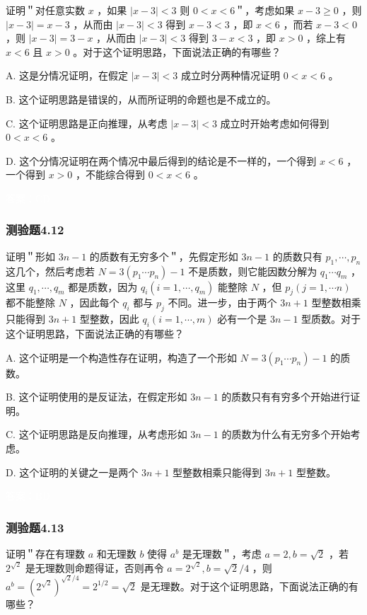 \documentclass[UTF8, heading=true]{ctexart}
\begin{document}
证明＂对任意实数 $x$ ，如果 $|x-3|<3$ 则 $0<x<6$＂，考虑如果 $x-3 \geq 0$ ，则 $|x-3|=x-3$ ，从而由 $|x-3|<3$ 得到 $x-3<3$ ，即 $x<6$ ，而若 $x-3<0$ ，则 $|x-3|=3-x$ ，从而由 $|x-3|<3$ 得到 $3-x<3$ ，即 $x>0$ ，综上有 $x<6$ 且 $x>0$ 。对于这个证明思路，下面说法正确的有哪些？

A. 这是分情况证明，在假定 $|x-3|<3$ 成立时分两种情况证明 $0<x<6$ 。

B. 这个证明思路是错误的，从而所证明的命题也是不成立的。

C. 这个证明思路是正向推理，从考虑 $|x-3|<3$ 成立时开始考虑如何得到 $0<x<6$ 。

D. 这个分情况证明在两个情况中最后得到的结论是不一样的，一个得到 $x<6$ ，一个得到 $x>0$ ，不能综合得到 $0<x<6$ 。


\textcolor{white}{答案：CD}

\subsubsection{测验题4.12}

证明＂形如 $3 n-1$ 的质数有无穷多个＂，先假定形如 $3 n-1$ 的质数只有 $p_1, \cdots, p_n$ 这几个，然后考虑若 $N=3\left(p_1 \cdots p_n\right)-1$ 不是质数，则它能因数分解为 $q_1 \cdots q_m$ ，这里 $q_1, \cdots, q_m$ 都是质数，因为 $q_i\left(i=1, \cdots, q_m\right)$ 能整除 $N$ ，但 $p_j(j=1, \cdots n)$ 都不能整除 $N$ ，因此每个 $q_i$ 都与 $p_j$ 不同。进一步，由于两个 $3 n+1$ 型整数相乘只能得到 $3 n+1$ 型整数，因此 $q_i(i=1, \cdots, m)$ 必有一个是 $3 n-1$ 型质数。对于这个证明思路，下面说法正确的有哪些？

A. 
这个证明是一个构造性存在证明，构造了一个形如 $N=3\left(p_1 \cdots p_n\right)-1$ 的质数。

B. 
这个证明使用的是反证法，在假定形如 $3 n-1$ 的质数只有有穷多个开始进行证明。

C. 
这个证明思路是反向推理，从考虑形如 $3 n-1$ 的质数为什么有无穷多个开始考虑。

D.  
这个证明的关键之一是两个 $3 n+1$ 型整数相乘只能得到 $3 n+1$ 型整数。

\textcolor{white}{答案：BD}

\subsubsection{测验题4.13}

证明＂存在有理数 $a$ 和无理数 $b$ 使得 $a^b$ 是无理数＂，考虑 $a=2, b=\sqrt{2}$ ，若 $2^{\sqrt{2}}$ 是无理数则命题得证，否则再令 $a=2^{\sqrt{2}}, b=\sqrt{2} / 4$ ，则 $a^b=\left(2^{\sqrt{2}}\right)^{\sqrt{2} / 4}=2^{1 / 2}=\sqrt{2}$ 是无理数。对于这个证明思路，下面说法正确的有哪些？
\end{document}
